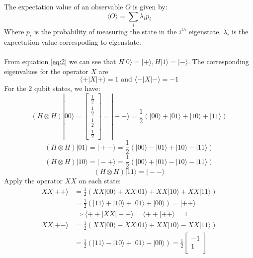 \documentclass{article}
\begin{document}
\begin{itemize}
	      The expectation value of an observable \(O\) is given by:
	      \begin{equation*}
		      \langle O \rangle = \sum_{i} \lambda_i p_i
	      \end{equation*}
	      Where \(p_i\) is the probability of measuring the state in the \(i^{th}\) eigenstate. $\lambda_i$ is the expectation value correspoding to eigenstate.\\ \\
	      From equation \eqref{eq:2} we can see that \(H |0 \rangle = | + \rangle, H|1\rangle = | - \rangle\). The corresponding eigenvalues for the operator \(X\) are
	      \[\langle + | X |+ \rangle = 1 \text{ and } \langle - | X | - \rangle = -1\]
	      For the 2 qubit states, we have:
	      \[(H \otimes H)|00\rangle = \begin{bmatrix}
			      \frac{1}{2} \\
			      \frac{1}{2} \\
			      \frac{1}{2} \\
			      \frac{1}{2}
		      \end{bmatrix} = |++\rangle = \frac{1}{2}(|00\rangle + |01\rangle + |10\rangle + |11\rangle)\]
	      \[(H \otimes H)|01\rangle =|+-\rangle = \frac{1}{2}(|00\rangle - |01\rangle +|10\rangle -|11\rangle)\]
	      \[(H \otimes H)|10\rangle =|-+\rangle = \frac{1}{2} (|00\rangle + |01\rangle - |10\rangle - |11\rangle)\]
	      \[(H \otimes H)|11\rangle =|--\rangle\]
	      Apply the operator \(XX\) on each state:
	      \begin{align*}
		      XX|++\rangle & = \frac{1}{2}(XX|00\rangle + XX|01\rangle + XX|10\rangle + XX|11\rangle)                       \\
		                   & = \frac{1}{2}(|11\rangle + |10\rangle + |01\rangle + |00\rangle) = |++\rangle                  \\
		                   & \Rightarrow \langle++ |XX|++ \rangle = \langle++ |++ \rangle =1                                \\
		      XX|+-\rangle & = \frac{1}{2}(XX|00\rangle - XX|01\rangle + XX|10\rangle - XX|11\rangle)                       \\
		                   & = \frac{1}{2}(|11\rangle - |10\rangle + |01\rangle - |00\rangle) = \frac{1}{2} \begin{bmatrix}
			                                                                                                    -1 \\
			                                                                                                    1  \\

\end{bmatrix}
\end{align*}
\end{itemize}
\end{document}
